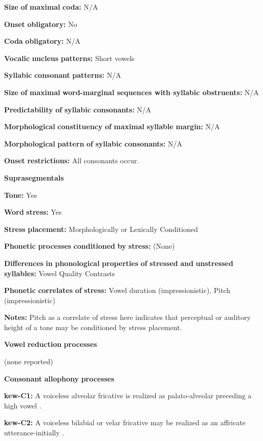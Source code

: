 \textbf{Size} \textbf{of} \textbf{maximal} \textbf{coda:} N/A

\textbf{Onset} \textbf{obligatory:} No

\textbf{Coda} \textbf{obligatory:} N/A

\textbf{Vocalic} \textbf{nucleus} \textbf{patterns:} Short vowels

\textbf{Syllabic} \textbf{consonant} \textbf{patterns:} N/A

\textbf{Size} \textbf{of} \textbf{maximal} \textbf{word{}-marginal sequences with syllabic obstruents:} N/A

\textbf{Predictability} \textbf{of} \textbf{syllabic} \textbf{consonants:} N/A

\textbf{Morphological} \textbf{constituency} \textbf{of} \textbf{maximal} \textbf{syllable} \textbf{margin:} N/A

\textbf{Morphological} \textbf{pattern} \textbf{of} \textbf{syllabic} \textbf{consonants:} N/A

\textbf{Onset} \textbf{restrictions:} All consonants occur.

\textbf{Suprasegmentals}

\textbf{Tone:} Yes

\textbf{Word} \textbf{stress:} Yes

\textbf{Stress} \textbf{placement:} Morphologically or Lexically Conditioned

\textbf{Phonetic} \textbf{processes} \textbf{conditioned} \textbf{by} \textbf{stress:} (None)

\textbf{Differences} \textbf{in} \textbf{phonological} \textbf{properties} \textbf{of} \textbf{stressed} \textbf{and} \textbf{unstressed} \textbf{syllables:} Vowel Quality Contrasts

\textbf{Phonetic} \textbf{correlates} \textbf{of} \textbf{stress:} Vowel duration (impressionistic), Pitch (impressionistic)

\textbf{Notes:} Pitch as a correlate of stress here indicates that perceptual or auditory height of a tone may be conditioned by stress placement.

\textbf{Vowel} \textbf{reduction} \textbf{processes}

(none reported)

\textbf{Consonant} \textbf{allophony} \textbf{processes}

\textbf{kew-C1:} A voiceless alveolar fricative is realized as palato-alveolar preceding a high vowel \citep[24]{Franklin1971}.

\textbf{kew-C2:} A voiceless bilabial or velar fricative may be realized as an affricate utterance-initially \citep[24]{Franklin1971}.

